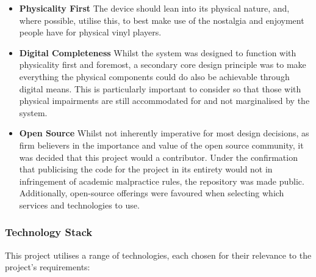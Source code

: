                \begin{itemize}
                    \item \textbf{Physicality First} The device should lean into its physical nature, and, where possible, utilise this, to best make use of the nostalgia and enjoyment people have for physical vinyl players.
                \end{itemize}
    
                \begin{itemize}
                    \item \textbf{Digital Completeness} Whilst the system was designed to function with physicality first and foremost, a secondary core design principle was to make everything the physical components could do also be achievable through digital means. This is particularly important to consider so that those with physical impairments are still accommodated for and not marginalised by the system.
                \end{itemize}
    
                \begin{itemize}
                    \item \textbf{Open Source} Whilst not inherently imperative for most design decisions, as firm believers in the importance and value of the open source community, it was decided that this project would a contributor. Under the confirmation that publicising the code for the project in its entirety would not in infringement of academic malpractice rules, the repository was made public. Additionally, open-source offerings were favoured when selecting which services and technologies to use.
                \end{itemize}
        
            \subsubsection{Technology Stack}
    
                This project utilises a range of technologies, each chosen for their relevance to the project’s requirements:
                
